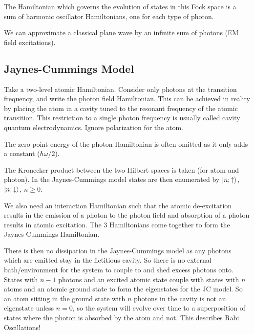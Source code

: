 \documentclass[aps,pra,twocolumn,showpacs,amsmath,amssymb,nofootinbib,longbibliography,superscriptaddress
]{revtex4-1}
\DeclarePairedDelimiter\ket{\lvert}{\rangle}
\theoremstyle{definition}
\theoremstyle{remark}
\newcommand{\0}{\hat{0}}
\begin{document}
The Hamiltonian which governs the evolution of states in this Fock space is a sum of harmonic oscillator Hamiltonians, one for each type of photon.

We can approximate a classical plane wave by an infinite sum of photons (EM field excitations).

\subsection{Jaynes-Cummings Model}

Take a two-level atomic Hamiltonian. Consider only photons at the transition frequency, and write the photon field Hamiltonian. This can be achieved in reality by placing the atom in a cavity tuned to the resonant frequency of the atomic transition. This restriction to a single photon frequency is usually called cavity quantum electrodynamics. Ignore polarization for the atom.

The zero-point energy of the photon Hamiltonian is often omitted as it only adds a constant ($\hbar \omega /2$).

The Kronecker product between the two Hilbert spaces is taken (for atom and photon). In the Jaynes-Cummings model states are then enumerated by $\ket{n;\uparrow}$, $\ket{n;\downarrow}$, $n \geq 0$.

We also need an interaction Hamiltonian such that the atomic de-excitation results in the emission of a photon to the photon field and absorption of a photon results in atomic excitation. The 3 Hamiltonians come together to form the Jaynes-Cummings Hamiltonian.

There is then no dissipation in the Jaynes-Cummings model as any photons which are emitted stay in the fictitious cavity. So there is no external bath/environment for the system to couple to and shed excess photons onto. States with $n-1$ photons and an excited atomic state couple with states with $n$ atoms and an atomic ground state to form the eigenstates for the JC model. So an atom sitting in the ground state with $n$ photons in the cavity is not an eigenstate unless $n=0$, so the system will evolve over time to a superposition of states where the photon is absorbed by the atom and not. This describes Rabi Oscillations!
\end{document}
